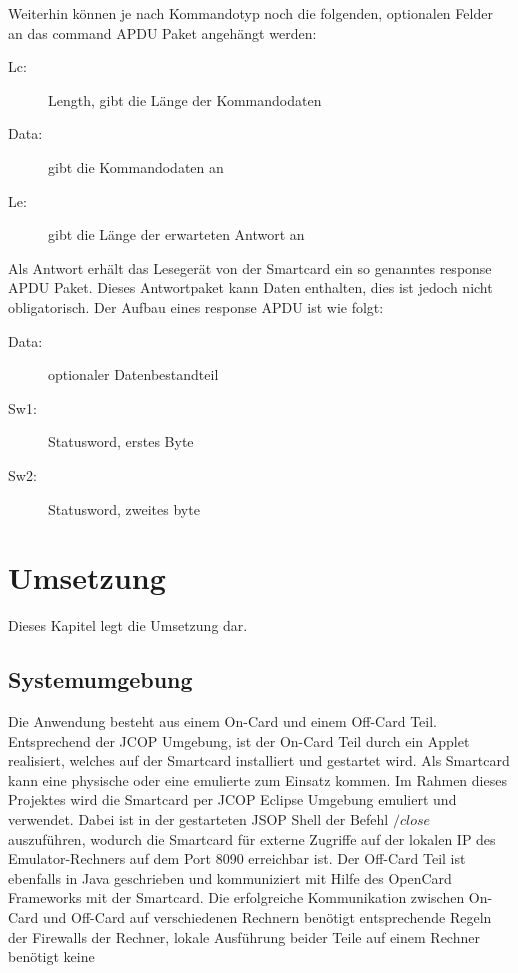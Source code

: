 \documentclass[a4paper,12pt]{scrartcl}
\begin{document}
Weiterhin können je nach Kommandotyp noch die folgenden, optionalen Felder an das command APDU Paket angehängt werden:

\begin{description}
\item[Lc:] Length, gibt die Länge der Kommandodaten
\item[Data:] gibt die Kommandodaten an
\item[Le:] gibt die Länge der erwarteten Antwort an
\end{description}

Als Antwort erhält das Lesegerät von der Smartcard ein so genanntes response APDU Paket. Dieses Antwortpaket kann Daten enthalten, dies ist jedoch nicht obligatorisch. 
Der Aufbau eines response APDU ist wie folgt:

\begin{description}
\item[Data:] optionaler Datenbestandteil
\item[Sw1:] Statusword, erstes Byte
\item[Sw2:] Statusword, zweites byte
\end{description}

\clearpage
\section{Umsetzung}
\label{sec:3}

Dieses Kapitel legt die Umsetzung dar.

\subsection{Systemumgebung}
\label{subsec:3.1}

Die Anwendung besteht aus einem On-Card und einem Off-Card Teil.
Entsprechend der JCOP Umgebung, ist der On-Card Teil durch ein Applet realisiert, welches auf der Smartcard installiert und gestartet wird.
Als Smartcard kann eine physische oder eine emulierte zum Einsatz kommen.
Im Rahmen dieses Projektes wird die Smartcard per JCOP Eclipse Umgebung emuliert und verwendet.
Dabei ist in der gestarteten JSOP Shell der Befehl $/close$ auszuführen, wodurch die Smartcard für externe  Zugriffe auf der lokalen IP des Emulator-Rechners auf dem Port 8090 erreichbar ist.
Der Off-Card Teil ist ebenfalls in Java geschrieben und kommuniziert mit Hilfe des OpenCard Frameworks mit der Smartcard.
Die erfolgreiche Kommunikation zwischen On-Card und Off-Card auf verschiedenen Rechnern benötigt entsprechende Regeln der Firewalls der Rechner, lokale Ausführung beider Teile auf einem Rechner benötigt keine 
\end{document}
